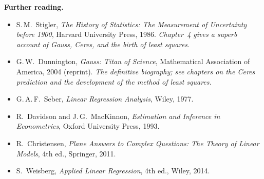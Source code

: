 \bigskip
\noindent\textbf{Further reading.}
\begin{itemize}[nosep]
  \item S.\,M.\ Stigler, \emph{The History of Statistics: The Measurement of
        Uncertainty before 1900}, Harvard University Press, 1986.
        \textit{Chapter~4 gives a superb account of Gauss, Ceres, and the
        birth of least squares.}
  \item G.\,W.\ Dunnington, \emph{Gauss: Titan of Science}, Mathematical
        Association of America, 2004 (reprint).
        \textit{The definitive biography; see chapters on the Ceres
        prediction and the development of the method of least squares.}
  \item G.\,A.\,F.\ Seber, \emph{Linear Regression Analysis}, Wiley, 1977.
  \item R.\ Davidson and J.\,G.\ MacKinnon, \emph{Estimation and Inference
        in Econometrics}, Oxford University Press, 1993.
  \item R.\ Christensen, \emph{Plane Answers to Complex Questions: The Theory
        of Linear Models}, 4th ed., Springer, 2011.
  \item S.\ Weisberg, \emph{Applied Linear Regression}, 4th ed., Wiley, 2014.
\end{itemize}


